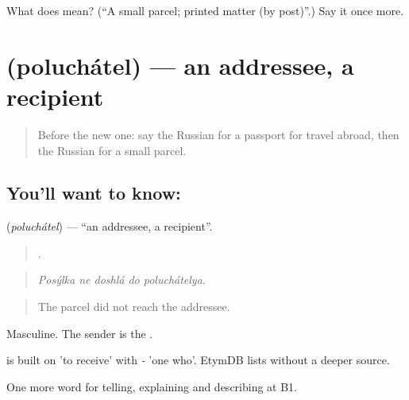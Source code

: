 \begin{tcolorbox}[breakable,colback=teal!4,colframe=teal!35!black,title={Before you move on}]
What does  mean? (\textquotedblleft{}A small parcel; printed matter (by post)\textquotedblright{}.) Say it once more.
\end{tcolorbox}
\section[\texorpdfstring{\ru{получатель} (poluchátel)}{получатель (poluchátel)}]{ (poluchátel) — an addressee, a recipient}

\label{lesson:RU-C451-poluchatel}



\begin{quote}
Before the new one: say the Russian for a passport for travel abroad, then the Russian for a small parcel.
\end{quote}

\subsection*{You'll want to know: }
\textbf{} (\emph{poluchátel}) — \textquotedblleft{}an addressee, a recipient\textquotedblright{}.

\begin{quote}
    .
\end{quote}

\begin{quote}
\emph{Posýlka ne doshlá do poluchátelya.}
\end{quote}

\begin{quote}
The parcel did not reach the addressee.
\end{quote}

Masculine. The sender is the \emph{}.

\begin{cousinweb}
\emph{} is built on \emph{} 'to receive' with \emph{-} 'one who'. EtymDB lists \emph{} without a deeper source.
\end{cousinweb}

\begin{grammarlens}[title={What you've built}]
One more word for telling, explaining and describing at B1.
\end{grammarlens}

